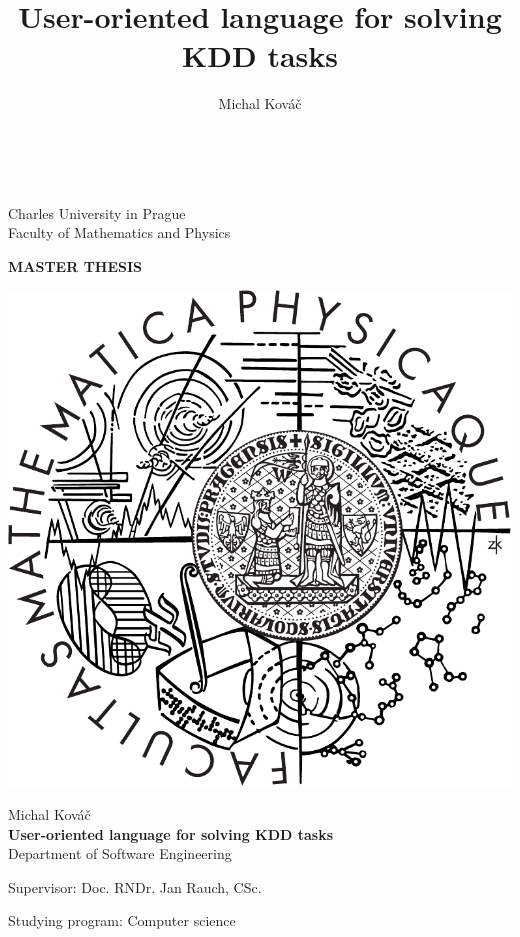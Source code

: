 \documentclass[a4paper,12pt]{book}
\author{Michal Kováč}
\title{User-oriented language for solving KDD tasks}
\begin{document}
\begin{titlepage}
\begin{center}
\ \\

\vspace{15mm}

\large
Charles University in Prague\\
Faculty of Mathematics and Physics\\

\vspace{5mm}

{\Large\bf MASTER THESIS}

\vspace{10mm}

\includegraphics[scale=0.5]{logo}

\vspace{15mm}

{\Large Michal Kováč}\\
\vspace{5mm}
{\Large\bf User-oriented language for solving KDD tasks}\\
\vspace{5mm}
Department of Software Engineering
\vspace{15mm}

\large
\noindent Supervisor: Doc. RNDr. Jan Rauch, CSc.
\vspace{1mm}

\noindent Studying program: Computer science
\end{center}
\end{titlepage} %
\end{document}
